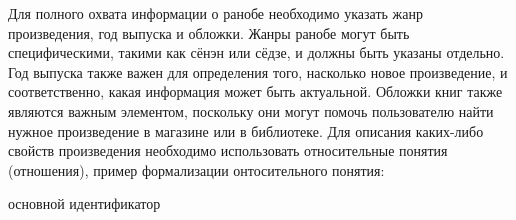 %

Для полного охвата информации о ранобе необходимо указать жанр произведения, год выпуска и обложки. Жанры ранобе могут быть специфическими, такими как сёнэн или сёдзе, и должны быть указаны отдельно. Год выпуска также важен для определения того, насколько новое произведение, и соответственно, какая информация может быть актуальной. Обложки книг также являются важным элементом, поскольку они могут помочь пользователю найти нужное произведение в магазине или в библиотеке. Для описания каких-либо свойств произведения необходимо использовать относительные понятия (отношения), пример формализации онтосительного понятия:

\begin{SCn}
    \begin{scnrelfromlist}{основной идентификатор}
        \begin{scnindent}
        \end{scnindent}
        \begin{scnindent}
        \end{scnindent}
    \end{scnrelfromlist}
    


\end{SCn}



